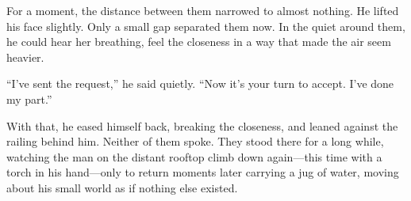 For a moment, the distance between them narrowed to almost nothing. He lifted his face slightly. Only a small gap separated them now. In the quiet around them, he could hear her breathing, feel the closeness in a way that made the air seem heavier.

``I've sent the request,'' he said quietly. ``Now it's your turn to accept. I've done my part.''

With that, he eased himself back, breaking the closeness, and leaned against the railing behind him. Neither of them spoke. They stood there for a long while, watching the man on the distant rooftop climb down again—this time with a torch in his hand—only to return moments later carrying a jug of water, moving about his small world as if nothing else existed.